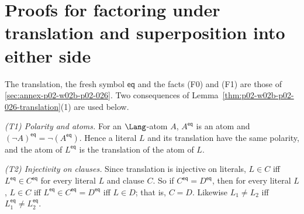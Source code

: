 \section{Proofs for factoring under translation and superposition into either side}
\label{sec:annex-p02-w02c-p02-021}

The translation, the fresh symbol \(\mathsf{eq}\) and the facts (F0) and (F1)
are those of \cref{sec:annex-p02-w02b-p02-026}.  Two consequences of
Lemma~\ref{thm:p02-w02b-p02-026-translation}(1) are used below.

\emph{(T1) Polarity and atoms.}  For an \(\Lang\)-atom \(A\),
\(A^{\mathsf{eq}}\) is an atom and \((\neg A)^{\mathsf{eq}}=\neg(A^{\mathsf{eq}})\).
Hence a literal \(L\) and its translation have the same polarity, and the
atom of \(L^{\mathsf{eq}}\) is the translation of the atom of \(L\).

\emph{(T2) Injectivity on clauses.}  Since translation is injective on
literals, \(L\in C\) iff \(L^{\mathsf{eq}}\in C^{\mathsf{eq}}\) for every
literal \(L\) and clause \(C\).  So if \(C^{\mathsf{eq}}=D^{\mathsf{eq}}\),
then for every literal \(L\), \(L\in C\) iff \(L^{\mathsf{eq}}\in
C^{\mathsf{eq}}=D^{\mathsf{eq}}\) iff \(L\in D\); that is, \(C=D\).  Likewise
\(L_1\neq L_2\) iff \(L_1^{\mathsf{eq}}\neq L_2^{\mathsf{eq}}\).


